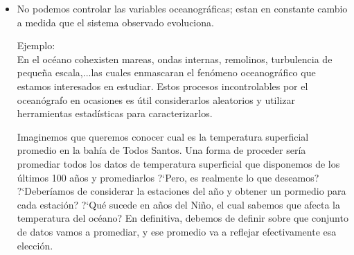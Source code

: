 \documentclass[
]{agujournal2019}
\begin{document}
\begin{itemize}
Inevitablemente, las pequeñas escalas o fluctuaciones respecto a la larga escala
aparecen en la expresión de la aceleración de larga escala. De forma que la
separación que deseamos no es tan simple ya que debemos de conocer la
estadística de la pequeña escala para poder describir la circulación
promedia. El término $<{\textbf u}'_h u'>$ se denomina esfuerzo
de Reynolds y nos informa de la correlación entre las componentes fluctuantes
(alta frecuencia) de la velocidad. Por ejemplo, $<u'v'>=0$ significa que no existe
correlación y hablamos de isotropía. Si $<u'v'><0$, significa que las
fluctuaciones están inversamente correlacionadas, i.e., anisotropía.
Este es un gran problema no resuelto en la oceanografía física.
El esfuerzo de Reynolds aparece porque la advección es no-lineal de tal forma
que no podemos estudiar la larga escala sin conocer información de la pequeña
escala que es un proceso aleatorio. Por similitud con el flujo laminar, los términos
de esfuerzo de Reynolds se parametrizan estadísticamente como proporcionales a
los gradientes de velocidad. El factor de proporcionalidad es el coeficiente de
viscosidad, en este caso, turbulento. Es aqui donde utilizar herramientas
estadísticas tiene sentido.

\item {No podemos controlar las variables oceanográficas; estan en constante cambio
a medida que el sistema observado evoluciona.}

\vspace{0.5cm}
{\noindent Ejemplo:}\\
En el océano cohexisten mareas, ondas internas, remolinos, turbulencia de pequeña
escala,...las cuales enmascaran el fenómeno oceanográfico que estamos interesados en
estudiar. Estos procesos incontrolables por el oceanógrafo en ocasiones es útil considerarlos
aleatorios y utilizar herramientas estadísticas para caracterizarlos. 

Imaginemos que queremos conocer cual es la temperatura superficial promedio
en la bahía de Todos Santos. Una forma de proceder sería promediar todos los
datos de temperatura superficial que disponemos de los últimos 100 años y promediarlos
?`Pero, es realmente lo que deseamos? ?`Deberíamos de considerar la estaciones del año
y obtener un pormedio para cada estación? ?`Qué sucede en años del Niño, el cual
sabemos que afecta la temperatura del océano? En definitiva, {debemos de
definir sobre que conjunto de datos vamos a promediar, y ese promedio
va a reflejar efectivamente esa elección.}
\\


\end{itemize}
\end{document}
